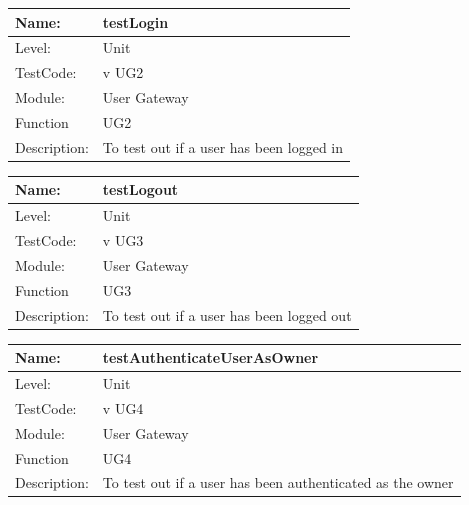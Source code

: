 \documentclass[12pt]{article}
\begin{document}
\begin{center}
\begin{tabular}{|l|p{12cm}|}
\hline

 Name: & testLogin\\
\hline
Level: & Unit \\
\hline
TestCode: & v UG2 \\
\hline
Module:& User Gateway\\
\hline
Function & UG2 \\
\hline
Description: & To test out if a user has been logged in \\
\hline

\end{tabular}
\end{center}


\begin{center}
\begin{tabular}{|l|p{12cm}|}
\hline

 Name: & testLogout\\
\hline
Level: & Unit \\
\hline
TestCode: & v UG3 \\
\hline
Module:& User Gateway\\
\hline
Function & UG3 \\
\hline
Description: & To test out if a user has been logged out \\
\hline

\end{tabular}
\end{center}


\begin{center}
\begin{tabular}{|l|p{12cm}|}
\hline

 Name: & testAuthenticateUserAsOwner \\
\hline
Level: & Unit \\
\hline
TestCode: & v UG4 \\
\hline
Module:& User Gateway\\
\hline
Function & UG4 \\
\hline
Description: & To test out if a user has been authenticated as the owner \\
\hline

\end{tabular}
\end{center}
\end{document}
